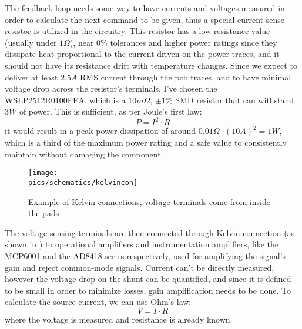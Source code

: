The feedback loop needs some way to have currents and voltages measured in order to calculate the next command to be given, thus a special current sense resistor is utilized in the circuitry.
This resistor has a low resistance value (usually under $1\Omega$), near 0\% tolerances and higher power ratings since they dissipate heat proportional to the current driven on the power traces, and it should not have its resistance drift with temperature changes.
Since we expect to deliver at least $2.5A$ RMS current through the \gls{pcb} traces, and to have minimal voltage drop across the resistor's terminals, I've chosen the WSLP2512R0100FEA, which is a $10m\Omega$, $\pm 1\%$ SMD resistor that can withstand $3W$ of power.
This is sufficient, as per Joule's first law:
\begin{equation}
\label{eq:Joulefirstlaw}
P = I^2 \cdot R
\end{equation}
it would result in a peak power dissipation of around $0.01\Omega \cdot (10A)^2 = 1W$, which is a third of the maximum power rating and a safe value to consistently maintain without damaging the component\cite{scherz2006practical}. 

\begin{figure}[!ht]
    \begin{center}\texttt{[image: \\pics/schematics/kelvincon]}\end{center}
    \caption{Example of Kelvin connections, voltage terminals come from inside the pads}
    \label{fig:kelvin}
\end{figure}

The voltage sensing terminals are then connected through \gls{Kelvin connection} (as shown in ) to operational amplifiers and instrumentation amplifiers, like the MCP6001 and the AD8418 series respectively, used for amplifying the signal's gain and reject common-mode signals.
Current can't be directly measured, however the voltage drop on the shunt can be quantified, and since it is defined to be small in order to minimize losses, gain amplification needs to be done\cite{scherz2006practical}. 
To calculate the source current, we can use Ohm's law:
\begin{equation}
\label{eq:Ohmslaw}
V = I \cdot R
\end{equation}
where the voltage is measured and resistance is already known.

